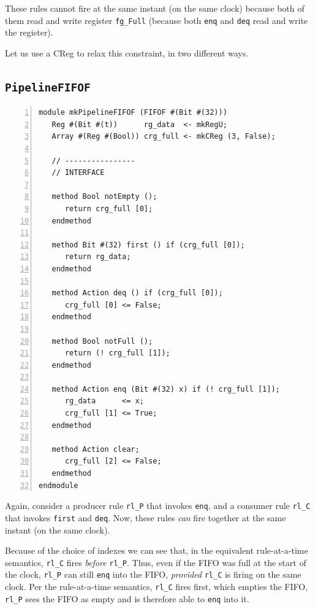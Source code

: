 These rules cannot fire at the same instant (on the same clock)
because both of them read and write register \verb|fg_Full| (because
both \verb|enq| and \verb|deq| read and write the register).

Let us use a CReg to relax this constraint, in two different ways.


\subsection{{\tt PipelineFIFOF}}

{\footnotesize
\begin{Verbatim}[frame=single, numbers=left]
module mkPipelineFIFOF (FIFOF #(Bit #(32)))
   Reg #(Bit #(t))      rg_data  <- mkRegU;
   Array #(Reg #(Bool)) crg_full <- mkCReg (3, False);

   // ----------------
   // INTERFACE

   method Bool notEmpty ();
      return crg_full [0];
   endmethod

   method Bit #(32) first () if (crg_full [0]);
      return rg_data;
   endmethod

   method Action deq () if (crg_full [0]);
      crg_full [0] <= False;
   endmethod

   method Bool notFull ();
      return (! crg_full [1]);
   endmethod

   method Action enq (Bit #(32) x) if (! crg_full [1]);
      rg_data      <= x;
      crg_full [1] <= True;
   endmethod

   method Action clear;
      crg_full [2] <= False;
   endmethod
endmodule
\end{Verbatim}
}

Again, consider a producer rule \verb|rl_P| that invokes \verb|enq|,
and a consumer rule \verb|rl_C| that invokes \verb|first| and
\verb|deq|.  Now, these rules \emph{can} fire together at the same
instant (on the same clock).

Because of the choice of indexes we can see that, in the equivalent
rule-at-a-time semantics, \verb|rl_C| fires \emph{before} \verb|rl_P|.
Thus, even if the FIFO was full at the start of the clock, \verb|rl_P|
can still \verb|enq| into the FIFO, \emph{provided} \verb|rl_C| is
firing on the same clock.  Per the rule-at-a-time semantics,
\verb|rl_C| fires first, which empties the FIFO, {\ie} \verb|rl_P|
sees the FIFO as empty and is therefore able to \verb|enq| into it.

